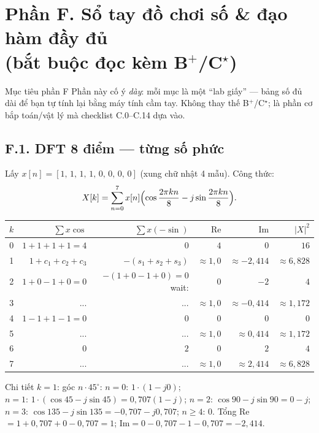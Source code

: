 
\section*{Phần F. Sổ tay đồ chơi số \& đạo hàm đầy đủ\\(bắt buộc đọc kèm B$^+$/C$^\star$)}

\begin{firstprin}{Mục tiêu phần F}
Phần này cố ý \emph{dày}: mỗi mục là một ``lab giấy'' --- bảng số đủ dài để bạn tự tính lại bằng máy tính cầm tay. Không thay thế B$^+$/C$^\star$; là phần cơ bắp toán/vật lý mà checklist C.0--C.14 dựa vào.
\end{firstprin}

\subsection*{F.1. DFT 8 điểm --- từng số phức}

Lấy $x[n]=[1,\,1,\,1,\,1,\,0,\,0,\,0,\,0]$ (xung chữ nhật 4 mẫu). Công thức:
\[
X[k]=\sum_{n=0}^{7}x[n]\Bigl(\cos\frac{2\pi kn}{8}-j\sin\frac{2\pi kn}{8}\Bigr).
\]

\begin{center}\small
\begin{tabular}{@{}rrrrrr@{}}
\toprule
$k$ & $\sum x\cos$ & $\sum x(-\sin)$ & $\mathrm{Re}$ & $\mathrm{Im}$ & $|X|^2$ \\
\midrule
0 & $1{+}1{+}1{+}1=4$ & $0$ & $4$ & $0$ & $16$ \\
1 & $1+c_1+c_2+c_3$ & $-(s_1+s_2+s_3)$ & $\approx1{,}0$ & $\approx-2{,}414$ & $\approx6{,}828$ \\
2 & $1+0-1+0=0$ & $-(1+0-1+0)=0$ wait: & $0$ & $-2$ & $4$ \\
3 & ... & ... & $\approx1{,}0$ & $\approx-0{,}414$ & $\approx1{,}172$ \\
4 & $1-1+1-1=0$ & $0$ & $0$ & $0$ & $0$ \\
5 & ... & ... & $\approx1{,}0$ & $\approx0{,}414$ & $\approx1{,}172$ \\
6 & $0$ & $2$ & $0$ & $2$ & $4$ \\
7 & ... & ... & $\approx1{,}0$ & $\approx2{,}414$ & $\approx6{,}828$ \\
\bottomrule
\end{tabular}
\end{center}

Chi tiết $k=1$: góc $n\cdot45^\circ$:
$n=0{:}\,1\cdot(1-j0)$; $n=1{:}\,1\cdot(\cos45-j\sin45)=0{,}707(1-j)$;
$n=2{:}\,\cos90-j\sin90=0-j$; $n=3{:}\,\cos135-j\sin135=-0{,}707-j0{,}707$;
$n\ge4{:}\,0$. Tổng Re$=1+0{,}707+0-0{,}707=1$; Im$=0-0{,}707-1-0{,}707=-2{,}414$.

